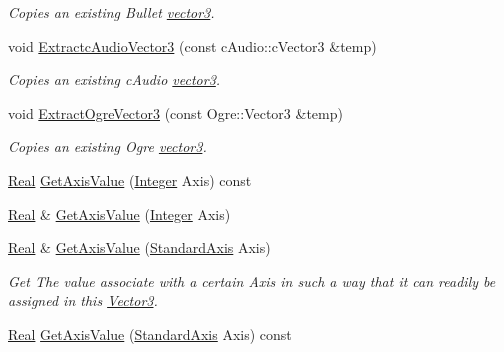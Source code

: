 \begin{DoxyCompactItemize}
\begin{DoxyCompactList}\small\item\em Copies an existing Bullet \hyperlink{classvector3}{vector3}. \item\end{DoxyCompactList}\item 
void \hyperlink{classMezzanine_1_1Vector3_a067981af0fe3fca1e3589de024473a61}{ExtractcAudioVector3} (const cAudio::cVector3 \&temp)
\begin{DoxyCompactList}\small\item\em Copies an existing cAudio \hyperlink{classvector3}{vector3}. \item\end{DoxyCompactList}\item 
void \hyperlink{classMezzanine_1_1Vector3_a8458214b99c59a30d9d8cc2d9efd19bd}{ExtractOgreVector3} (const Ogre::Vector3 \&temp)
\begin{DoxyCompactList}\small\item\em Copies an existing Ogre \hyperlink{classvector3}{vector3}. \item\end{DoxyCompactList}\item 
\hyperlink{namespaceMezzanine_a726731b1a7df72bf3583e4a97282c6f6}{Real} \hyperlink{classMezzanine_1_1Vector3_a54db774dc4ee3cf620790c97b44f6d91}{GetAxisValue} (\hyperlink{namespaceMezzanine_ac3576e52af3c62d13dde94829e0c5465}{Integer} Axis) const 
\item 
\hyperlink{namespaceMezzanine_a726731b1a7df72bf3583e4a97282c6f6}{Real} \& \hyperlink{classMezzanine_1_1Vector3_ab23f2a5d206ad5fff3fe422e64e569c1}{GetAxisValue} (\hyperlink{namespaceMezzanine_ac3576e52af3c62d13dde94829e0c5465}{Integer} Axis)
\item 
\hyperlink{namespaceMezzanine_a726731b1a7df72bf3583e4a97282c6f6}{Real} \& \hyperlink{classMezzanine_1_1Vector3_a83ad1f8b0d517214cafb96beacd4af5a}{GetAxisValue} (\hyperlink{namespaceMezzanine_ab41a00a8c6a47b576dc987ec34e16ba1}{StandardAxis} Axis)
\begin{DoxyCompactList}\small\item\em Get The value associate with a certain Axis in such a way that it can readily be assigned in this \hyperlink{classMezzanine_1_1Vector3}{Vector3}. \item\end{DoxyCompactList}\item 
\hyperlink{namespaceMezzanine_a726731b1a7df72bf3583e4a97282c6f6}{Real} \hyperlink{classMezzanine_1_1Vector3_a05edc8c1ba36c255eabe6a433b6618c4}{GetAxisValue} (\hyperlink{namespaceMezzanine_ab41a00a8c6a47b576dc987ec34e16ba1}{StandardAxis} Axis) const 

\end{DoxyCompactItemize}
